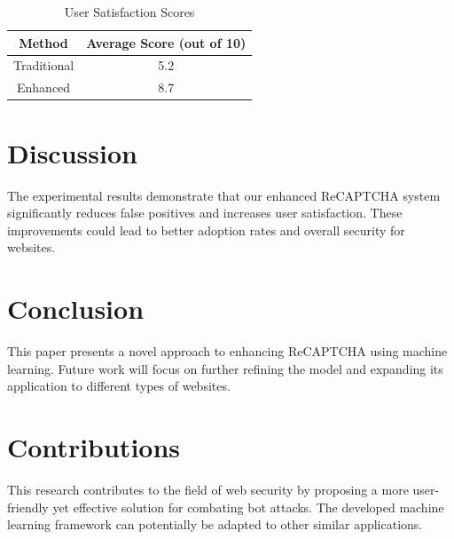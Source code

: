 \documentclass{article}
\begin{document}
\begin{table}[ht]
\centering
\caption{User Satisfaction Scores}
\label{tab:user_satisfaction}
\begin{tabular}{cc}
\toprule
Method & Average Score (out of 10) \\
\midrule
Traditional & 5.2 \\
Enhanced & 8.7 \\
\bottomrule
\end{tabular}
\end{table}

\section{Discussion}
The experimental results demonstrate that our enhanced ReCAPTCHA system significantly reduces false positives and increases user satisfaction. These improvements could lead to better adoption rates and overall security for websites.

\section{Conclusion}
This paper presents a novel approach to enhancing ReCAPTCHA using machine learning. Future work will focus on further refining the model and expanding its application to different types of websites.

\section{Contributions}
This research contributes to the field of web security by proposing a more user-friendly yet effective solution for combating bot attacks. The developed machine learning framework can potentially be adapted to other similar applications.



\end{document}
